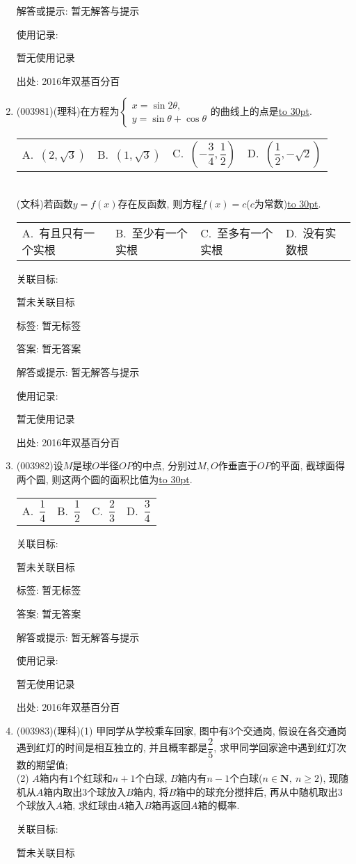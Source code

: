 \documentclass[10pt,a4paper]{article}
\newcommand{\blank}[1]{\underline{\hbox to #1pt{}}}
\newcommand{\fourch}[4]{\par\begin{tabular}{p{.23\textwidth}p{.23\textwidth}p{.23\textwidth}p{.23\textwidth}}
A.~#1 &B.~#2& C.~#3& D.~#4
\end{tabular}}
\begin{document}
\begin{enumerate}[1.]
解答或提示: 暂无解答与提示

使用记录:

暂无使用记录


出处: 2016年双基百分百
\item { (003981)}(理科)在方程为$\begin{cases}
x=\sin 2\theta,\\ y=\sin\theta+\cos\theta
\end{cases}$的曲线上的点是\blank{30}.
\fourch{$(2,\sqrt{3})$}{$(1,\sqrt{3})$}{$\left(-\dfrac 34,\dfrac 12\right)$}{$\left(\dfrac 12,-\sqrt{2}\right)$}\\
(文科)若函数$y=f(x)$存在反函数, 则方程$f(x)=c$($c$为常数)\blank{30}.
\fourch{有且只有一个实根}{至少有一个实根}{至多有一个实根}{没有实数根}


关联目标:

暂未关联目标



标签: 暂无标签

答案: 暂无答案

解答或提示: 暂无解答与提示

使用记录:

暂无使用记录


出处: 2016年双基百分百
\item { (003982)}设$M$是球$O$半径$OP$的中点, 分别过$M,O$作垂直于$OP$的平面, 截球面得两个圆, 则这两个圆的面积比值为\blank{30}.
\fourch{$\dfrac 14$}{$\dfrac 12$}{$\dfrac 23$}{$\dfrac 34$}


关联目标:

暂未关联目标



标签: 暂无标签

答案: 暂无答案

解答或提示: 暂无解答与提示

使用记录:

暂无使用记录


出处: 2016年双基百分百
\item { (003983)}(理科)(1) 甲同学从学校乘车回家, 图中有$3$个交通岗, 假设在各交通岗遇到红灯的时间是相互独立的, 并且概率都是$\dfrac 25$, 求甲同学回家途中遇到红灯次数的期望值;\\
(2) $A$箱内有$1$个红球和$n+1$个白球, $B$箱内有$n-1$个白球($n\in \mathbf{N}, \ n\ge 2$), 现随机从$A$箱内取出$3$个球放入$B$箱内, 将$B$箱中的球充分搅拌后, 再从中随机取出$3$个球放入$A$箱, 求红球由$A$箱入$B$箱再返回$A$箱的概率.


关联目标:

暂未关联目标




\end{enumerate}
\end{document}
